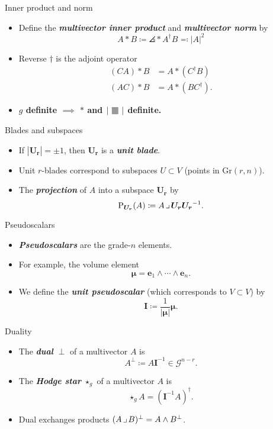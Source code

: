 \documentclass[aspectratio=169]{beamer}
\makeatletter
\newcommand\boldgreen[1]{\textcolor{lighter_csu_green}{\emph{\textbf{#1}}}}
\newcommand\boldgold[1]{\textcolor{csu_gold}{\textbf{#1}}}
\newcommand{\G}{\mathcal{G}}
\newcommand{\Grassmannian}[2]{\textrm{Gr}(#1,#2)}
\newcommand{\projection}{\operatorname{P}}
\newcommand{\blade}[1]{\boldsymbol{#1}}
\newcommand{\pseudoscalar}{\blade{I}}
\newcommand{\contract}{\hspace*{.5mm} \lrcorner \hspace*{.5mm}}
\DeclarePairedDelimiter\angles{\langle}{\rangle}
\newcommand{\proj}[2]{\angles*{#2}_{#1}}
\def\mathcolor#1#{\@mathcolor{#1}}
\def\@mathcolor#1#2#3{%
  \protect\leavevmode
  \begingroup
    \color#1{#2}#3%
  \endgroup
}
\newcommand{\blank}{\raisebox{-.3ex}{\mathcolor{light-gray}{\text{\large$\blacksquare$}}}}
\makeatother
\begin{document}
\begin{frame}{Inner product and norm}
\vfill
\begin{itemize}
\pause
\item Define the \boldgreen{multivector inner product} and \boldgreen{multivector norm} by
\[
A \ast B \coloneqq \proj{}{A^\dagger B} \eqqcolon |A|^2
\]
\pause
\item Reverse $\dagger$ is the adjoint operator
\begin{align*}
(CA) \ast B &= A \ast (C^\dagger B)\\
(AC) \ast B &= A \ast (BC^\dagger).
\end{align*}
\pause
\item \boldgold{$g$ definite $\implies$ $\ast$ and $|\blank|$ definite.}
\end{itemize}
\vfill
\end{frame}

\begin{frame}{Blades and subspaces}
\vfill
\begin{itemize}
\pause
\item If $|\blade{U_r}|=\pm 1$, then $\blade{U_r}$ is a \boldgreen{unit blade}.
\pause
\item Unit $r$-blades correspond to subspaces $U\subset V$ (points in $\Grassmannian{r}{n}$).
\pause
\item The \boldgreen{projection} of $A$ into a subspace $\blade{U_r}$ by
\[
\projection_{\blade{U_r}} (A) \coloneqq A\contract \blade{U_r}\blade{U_r}^{-1}.
\]
\end{itemize}
\vfill
\end{frame}

\begin{frame}{Pseudoscalars}
\vfill
\begin{itemize}
\pause
\item \boldgreen{Pseudoscalars} are the grade-$n$ elements.
\pause
\item For example, the volume element
\[
\blade{\mu} = \blade{e}_1 \wedge \cdots \wedge \blade{e}_n.
\]
\pause
\item We define the \boldgreen{unit pseudoscalar} (which corresponds to $V\subset V$) by
\[
\pseudoscalar \coloneqq \frac{1}{|\blade{\mu}|} \blade{\mu}.
\]
\end{itemize}
\vfill
\end{frame}

\begin{frame}{Duality}
\vfill
\begin{itemize}
\pause
\item The \boldgreen{dual} $\perp$ of a multivector $A$ is
\[
A^\perp \coloneqq A \pseudoscalar^{-1} \in \G^{n-r}.
\]
\pause
\item The \boldgreen{Hodge star} $\star_g$ of a multivector $A$ is
\[
\star_g A = (\pseudoscalar^{-1}A)^\dagger.
\]
\pause
\item Dual exchanges products $(A \contract B)^\perp = A \wedge B^\perp$.
\end{itemize}
\vfill
\end{frame}
\end{document}
